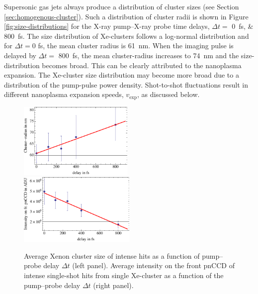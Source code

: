 Supersonic gas jets always produce a distribution of cluster sizes (see Section \ref{sec:homogenous-cluster}). Such a distribution of cluster radii is shown in Figure \ref{fig:size-distributions} for the X-ray pump--X-ray probe time delays, $\Delta t =$ \SIlist{0;800}{\femto\second}. The size distribution of Xe-clusters follows a log-normal distribution \citep{Schutte-2002-IJMS} and for $\Delta t=0$ fs, the mean cluster radius is \SI{61}{\nano\meter}. When the imaging pulse is delayed by $\Delta t=$ \SI{800}{\femto\second}, the mean cluster-radius increases to \SI{74}{\nano\meter} and the size-distribution becomes broad. This can be clearly attributed to the nanoplasma expansion. The Xe-cluster size distribution may become more broad due to a distribution of the pump-pulse power density. Shot-to-shot fluctuations result in different nanoplasma expansion speeds, $v_{\text{exp}}$, as discussed below.\\[1\baselineskip]
%
\begin{figure}
	\centering
		\includegraphics[width=0.49\textwidth]{images/filter-size.pdf}
		\includegraphics[width=0.50\textwidth]{images/filter-sum-frontpnCCD.pdf}
	\caption[Average cluster size correlated to measured intensity on front pnCCD.]{Average Xenon cluster size of intense hits as a function of pump--probe delay $\Delta t$ (left panel). Average intensity on the front pnCCD of intense single-shot hits from single Xe-cluster as a function of the pump--probe delay $\Delta t$ (right panel).}
	\label{fig:filter-size-intensity}
\end{figure}
%
